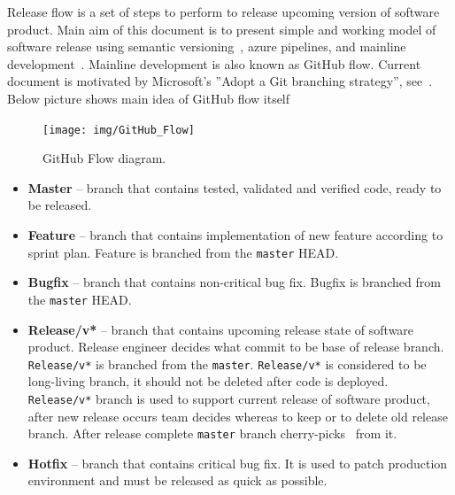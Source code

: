 Release flow is a set of steps to perform to release upcoming version of software product.
Main aim of this document is to present simple and working model of software release
using semantic versioning~\cite{SemanticVersioning}, azure pipelines,
and mainline development~\cite{MainlineDevelopment}.
Mainline development is also known as GitHub flow.
Current document is motivated by Microsoft's ''Adopt a Git branching strategy'', see~\cite{AdoptGitStrategy}.
Below picture shows main idea of GitHub flow itself
\begin{figure}[H]
    \centering
    \texttt{[image: img/GitHub\_Flow]}
    ~\caption{GitHub Flow diagram.}
\end{figure}
\begin{itemize}
    \item \textbf{Master} -- branch that contains tested, validated and verified code, ready to be released.
    \item \textbf{Feature} -- branch that contains implementation of new feature according to sprint plan.
    Feature is branched from the \texttt{master} HEAD\@.
    \item \textbf{Bugfix} -- branch that contains non-critical bug fix.
    Bugfix is branched from the \texttt{master} HEAD\@.
    \item \textbf{Release/v*} -- branch that contains upcoming release state of software product.
    Release engineer decides what commit to be base of release branch.
    \texttt{Release/v*} is branched from the \texttt{master}.
    \texttt{Release/v*} is considered to be long-living branch, it should not be deleted after code is deployed.
    \texttt{Release/v*} branch is used to support current release of software product, after new release occurs
    team decides whereas to keep or to delete old release branch.
    After release complete \texttt{master} branch cherry-picks~\cite{CherryPick} from it.
    \item \textbf{Hotfix} -- branch that contains critical bug fix.
    It is used to patch production environment and must be released as quick as possible.
\end{itemize}


